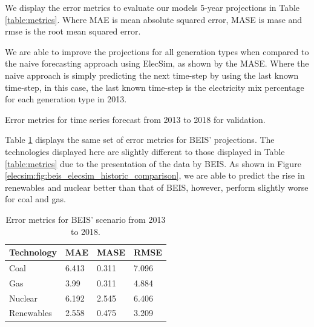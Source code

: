 








We display the error metrics to evaluate our models 5-year projections in Table \ref{table:metrics}. Where MAE is mean absolute squared error, MASE is \acrfull{mase} and \acrfull{rmse} is the root mean squared error.

We are able to improve the projections for all generation types when compared to the naive forecasting approach using ElecSim, as shown by the MASE. Where the naive approach is simply predicting the next time-step by using the last known time-step, in this case, the last known time-step is the electricity mix percentage for each generation type in 2013. 

\begin{table}[htb]
	\centering
	\caption{Error metrics for time series forecast from 2013 to 2018 for validation.}
	\label{table:metrics}
\end{table}


Table \ref{table:metrics_beis} displays the same set of error metrics for BEIS' projections. The technologies displayed here are slightly different to those displayed in Table \ref{table:metrics} due to the presentation of the data by BEIS. As shown in Figure \ref{elecsim:fig:beis_elecsim_historic_comparison}, we are able to predict the rise in renewables and nuclear better than that of BEIS, however, perform slightly worse for coal and gas.

\begin{table}[]
	\centering
	\begin{tabular}{@{}llll@{}}
		\toprule
		Technology       & MAE   & MASE  & RMSE  \\ \midrule
		Coal             & 6.413 & 0.311 & 7.096 \\
		Gas              & 3.99  & 0.311 & 4.884 \\
		Nuclear          & 6.192 & 2.545 & 6.406 \\
		Renewables       & 2.558 & 0.475 & 3.209 \\ \bottomrule
	\end{tabular}
	\caption{Error metrics for BEIS' scenario from 2013 to 2018.}
	\label{table:metrics_beis}
\end{table}

